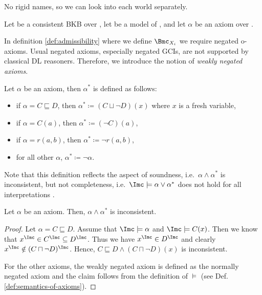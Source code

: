 No rigid names, so we can look into each world separately.






\begin{lemma}
  Let \Bmf be a consistent BKB over \Nsig, let \I be a model of \Bmf, and let $\alpha$ be an axiom
  over \Nsig. 
\end{lemma}


In definition \ref{def:admissibility} where we define $\Bmc_{X_{i}}$ we require negated
o-axioms. Usual negated axioms, especially negated GCIs, are not supported by classical DL
reasoners. Therefore, we introduce the notion of \emph{weakly negated axioms}.

\begin{definition}
  Let $\alpha$ be an axiom, then $\alpha^{*}$ is defined as follows:
  \begin{itemize}
  \item if $\alpha = C \sqsubseteq D$, then $\alpha^{*} \coloneqq (C \sqcup \lnot D)(x)$ where $x$
    is a fresh variable,
  \item if $\alpha = C(a)$, then $\alpha^{*} \coloneqq (\lnot C)(a)$,
  \item if $\alpha = r(a,b)$, then $\alpha^{*} \coloneqq \lnot r(a,b)$,
  \item for all other $\alpha$, $\alpha^{*} \coloneqq \lnot \alpha$. \qedhere
  \end{itemize}
\end{definition}

 Note that this definition reflects the aspect of soundness, i.e.~$\alpha\land\alpha^{*}$ is inconsistent, but not completeness,
i.e.~$\I\models\alpha\lor\alpha^{*}$ does not hold for all interpretations \I.

\begin{lemma}
  Let $\alpha$ be an axiom. Then, $\alpha\land\alpha^{*}$ is inconsistent.
\end{lemma}
\begin{proof}
  Let $\alpha = C \sqsubseteq D$. Assume that $\I \models \alpha$ and $\I \models
  C(x)$. Then we know that $x^{\I} \in C^{\I} \subseteq D^{\I}$. Thus we have $x^{\I} \in D^{\I}$
  and clearly $x^{\I} \notin (C \sqcap \lnot D)^{\I}$. Hence, $C \sqsubseteq D \land (C \sqcap \lnot
  D)(x)$ is inconsistent.

  For the other axioms, the weakly negated axiom is defined as the normally negated axiom and the
  claim follows from the definition of $\models$ (see Def. \ref{def:semantics-of-axioms}). 
\end{proof}


